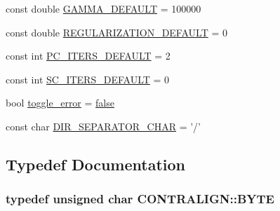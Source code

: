 \begin{DoxyCompactItemize}
\item 
const double \hyperlink{namespace_c_o_n_t_r_a_l_i_g_n_acc27a8d5de00a0e2b28341a554b1671e}{G\+A\+M\+M\+A\+\_\+\+D\+E\+F\+A\+U\+L\+T} = 100000
\item 
const double \hyperlink{namespace_c_o_n_t_r_a_l_i_g_n_ab8d1796ab4c3172fefb62e6551fc0e6a}{R\+E\+G\+U\+L\+A\+R\+I\+Z\+A\+T\+I\+O\+N\+\_\+\+D\+E\+F\+A\+U\+L\+T} = 0
\item 
const int \hyperlink{namespace_c_o_n_t_r_a_l_i_g_n_a7eae27d13bfe8d19d465e4e02325b7ca}{P\+C\+\_\+\+I\+T\+E\+R\+S\+\_\+\+D\+E\+F\+A\+U\+L\+T} = 2
\item 
const int \hyperlink{namespace_c_o_n_t_r_a_l_i_g_n_a5d28e8f24c1100580fce7418871aab48}{S\+C\+\_\+\+I\+T\+E\+R\+S\+\_\+\+D\+E\+F\+A\+U\+L\+T} = 0
\item 
bool \hyperlink{namespace_c_o_n_t_r_a_l_i_g_n_ab3c518611777e6b169ba6c8f0fadfc9d}{toggle\+\_\+error} = \hyperlink{naview_8c_a65e9886d74aaee76545e83dd09011727}{false}
\item 
const char \hyperlink{namespace_c_o_n_t_r_a_l_i_g_n_a10799300da481510c609583326c3bcaa}{D\+I\+R\+\_\+\+S\+E\+P\+A\+R\+A\+T\+O\+R\+\_\+\+C\+H\+A\+R} = '/'
\end{DoxyCompactItemize}


\subsection{Typedef Documentation}
\hypertarget{namespace_c_o_n_t_r_a_l_i_g_n_a493b7d65e8378d6b823fd6332f1caa79}{
\subsubsection[{B\+Y\+T\+E}]{\setlength{\rightskip}{0pt plus 5cm}typedef unsigned char {\bf C\+O\+N\+T\+R\+A\+L\+I\+G\+N\+::\+B\+Y\+T\+E}}}\label{namespace_c_o_n_t_r_a_l_i_g_n_a493b7d65e8378d6b823fd6332f1caa79}


